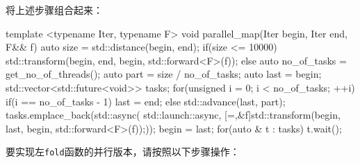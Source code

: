 将上述步骤组合起来：

\begin{cpp}
template <typename Iter, typename F>
void parallel_map(Iter begin, Iter end, F&& f)
{
    auto size = std::distance(begin, end);
    if(size <= 10000)
        std::transform(begin, end, begin, std::forward<F>(f));
    else
    {
        auto no_of_tasks = get_no_of_threads();
        auto part = size / no_of_tasks;
        auto last = begin;
        std::vector<std::future<void>> tasks;
        for(unsigned i = 0; i < no_of_tasks; ++i)
        {
            if(i == no_of_tasks - 1) last = end;
            else std::advance(last, part);
            tasks.emplace_back(std::async(
            std::launch::async,
                [=,&f]{std::transform(begin, last, begin,
                                      std::forward<F>(f));}));
            begin = last;
        }
        for(auto & t : tasks) t.wait();
    }
}
\end{cpp}

要实现左\verb|fold|函数的并行版本，请按照以下步骤操作：

